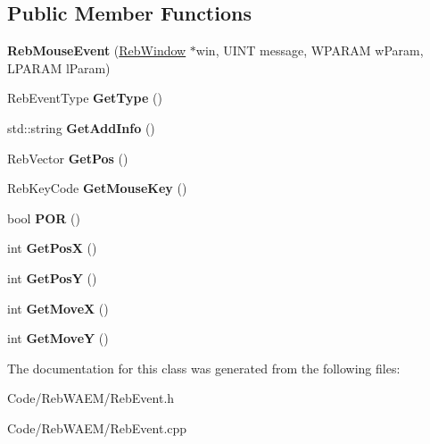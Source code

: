 \subsection*{Public Member Functions}
\begin{DoxyCompactItemize}
\item 
{\bfseries Reb\+Mouse\+Event} (\hyperlink{class_reb_window}{Reb\+Window} $\ast$win, U\+I\+NT message, W\+P\+A\+R\+AM w\+Param, L\+P\+A\+R\+AM l\+Param)\hypertarget{class_reb_mouse_event_acfce9de9511220fdbbfa7ea8f9f71235}{}\label{class_reb_mouse_event_acfce9de9511220fdbbfa7ea8f9f71235}

\item 
Reb\+Event\+Type {\bfseries Get\+Type} ()\hypertarget{class_reb_mouse_event_a8f2ab2d118ff7fe1be2fad41ed43d445}{}\label{class_reb_mouse_event_a8f2ab2d118ff7fe1be2fad41ed43d445}

\item 
std\+::string {\bfseries Get\+Add\+Info} ()\hypertarget{class_reb_mouse_event_a427d0f7d5514bee08fe5e7c758180e96}{}\label{class_reb_mouse_event_a427d0f7d5514bee08fe5e7c758180e96}

\item 
Reb\+Vector {\bfseries Get\+Pos} ()\hypertarget{class_reb_mouse_event_a95ac6fe0b9525183a88986b0dc31c787}{}\label{class_reb_mouse_event_a95ac6fe0b9525183a88986b0dc31c787}

\item 
Reb\+Key\+Code {\bfseries Get\+Mouse\+Key} ()\hypertarget{class_reb_mouse_event_a465d497f0e496abe82bfa372ced88c24}{}\label{class_reb_mouse_event_a465d497f0e496abe82bfa372ced88c24}

\item 
bool {\bfseries P\+OR} ()\hypertarget{class_reb_mouse_event_a97227d907eb4f5923f0d13e57ed7dd4b}{}\label{class_reb_mouse_event_a97227d907eb4f5923f0d13e57ed7dd4b}

\item 
int {\bfseries Get\+PosX} ()\hypertarget{class_reb_mouse_event_a3b1c3d94bd088819f8e17293f4c57380}{}\label{class_reb_mouse_event_a3b1c3d94bd088819f8e17293f4c57380}

\item 
int {\bfseries Get\+PosY} ()\hypertarget{class_reb_mouse_event_a64f86bbb0a241566e8c19eb9f098a340}{}\label{class_reb_mouse_event_a64f86bbb0a241566e8c19eb9f098a340}

\item 
int {\bfseries Get\+MoveX} ()\hypertarget{class_reb_mouse_event_a866a48a1db2422d28c6fbc6976ae6e49}{}\label{class_reb_mouse_event_a866a48a1db2422d28c6fbc6976ae6e49}

\item 
int {\bfseries Get\+MoveY} ()\hypertarget{class_reb_mouse_event_a602cd0b6a75365aaeba5f208204401fd}{}\label{class_reb_mouse_event_a602cd0b6a75365aaeba5f208204401fd}

\end{DoxyCompactItemize}


The documentation for this class was generated from the following files\+:\begin{DoxyCompactItemize}
\item 
Code/\+Reb\+W\+A\+E\+M/Reb\+Event.\+h\item 
Code/\+Reb\+W\+A\+E\+M/Reb\+Event.\+cpp\end{DoxyCompactItemize}
